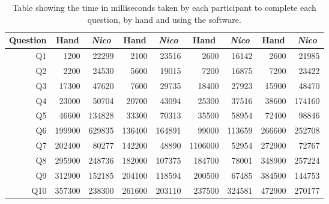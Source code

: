\documentclass[12pt,twoside,notitlepage,xetex]{report}
\begin{document}
\begin{center}
\begin{table}[H]
\begin{center}
\begin{tabular}{|r||r|r||r|r||r|r||r|r|}
\multicolumn{1}{|c||}{Question} & \multicolumn{1}{c|}{Hand} & \multicolumn{1}{c||}{\emph{Nico}} & \multicolumn{1}{c|}{Hand} & \multicolumn{1}{c||}{\emph{Nico}} & \multicolumn{1}{c|}{Hand} & \multicolumn{1}{c||}{\emph{Nico}} & \multicolumn{1}{c|}{Hand} & \multicolumn{1}{c|}{\emph{Nico}}\\ \hline \hline
Q1 & 1200 & 22299 & 2100 & 23516 & 2600 & 16142 & 2600 & 21985\\ \hline
Q2 & 2200 & 24530 & 5600 & 19015 & 7200 & 16875 & 7200 & 23422\\ \hline
Q3 & 17300 & 47620 & 7600 & 29735 & 18400 & 27923 & 15900 & 48470\\ \hline
Q4 & 23000 & 50704 & 20700 & 43094 & 25300 & 37516 & 38600 & 174160\\ \hline
Q5 & 46600 & 134828 & 33300 & 70313 & 35500 & 58954 & 72400 & 98846\\ \hline
Q6 & 199900 & 629835 & 136400 & 164891 & 99000 & 113659 & 266600 & 252708\\ \hline
Q7 & 202400 & 80277 & 142200 & 48890 & 1106000 & 52954 & 272900 & 72767\\ \hline
Q8 & 295900 & 248736 & 182000 & 107375 & 184700 & 78001 & 348900 & 257224\\ \hline
Q9 & 312900 & 152185 & 204100 & 118594 & 200500 & 67485 & 384500 & 144753\\ \hline
Q10 & 357300 & 238300 & 261600 & 203110 & 237500 & 324581 & 472900 & 270177\\
\hline
\end{tabular}
\end{center}
\caption{Table showing the time in milliseconds taken by each participant to complete each question, by hand and using the software.}
\label{tab:BigTimes}
\end{table}
\end{center}
\end{document}
